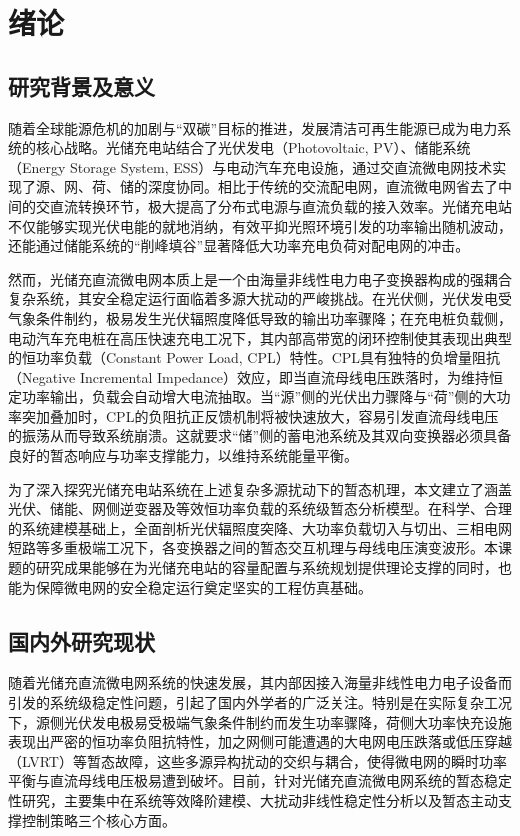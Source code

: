 \section{绪论}
\subsection{研究背景及意义}
随着全球能源危机的加剧与“双碳”目标的推进，发展清洁可再生能源已成为电力系统的核心战略。光储充电站结合了光伏发电（Photovoltaic, PV）、储能系统（Energy Storage System, ESS）与电动汽车充电设施，通过交直流微电网技术实现了源、网、荷、储的深度协同。相比于传统的交流配电网，直流微电网省去了中间的交直流转换环节，极大提高了分布式电源与直流负载的接入效率。光储充电站不仅能够实现光伏电能的就地消纳，有效平抑光照环境引发的功率输出随机波动，还能通过储能系统的“削峰填谷”显著降低大功率充电负荷对配电网的冲击。 


然而，光储充直流微电网本质上是一个由海量非线性电力电子变换器构成的强耦合复杂系统，其安全稳定运行面临着多源大扰动的严峻挑战。在光伏侧，光伏发电受气象条件制约，极易发生光伏辐照度降低导致的输出功率骤降；在充电桩负载侧，电动汽车充电桩在高压快速充电工况下，其内部高带宽的闭环控制使其表现出典型的恒功率负载（Constant Power Load, CPL）特性。CPL具有独特的负增量阻抗（Negative Incremental Impedance）效应，即当直流母线电压跌落时，为维持恒定功率输出，负载会自动增大电流抽取。当“源”侧的光伏出力骤降与“荷”侧的大功率突加叠加时，CPL的负阻抗正反馈机制将被快速放大，容易引发直流母线电压的振荡从而导致系统崩溃。这就要求“储”侧的蓄电池系统及其双向变换器必须具备良好的暂态响应与功率支撑能力，以维持系统能量平衡。


为了深入探究光储充电站系统在上述复杂多源扰动下的暂态机理，本文建立了涵盖光伏、储能、网侧逆变器及等效恒功率负载的系统级暂态分析模型。在科学、合理的系统建模基础上，全面剖析光伏辐照度突降、大功率负载切入与切出、三相电网短路等多重极端工况下，各变换器之间的暂态交互机理与母线电压演变波形。本课题的研究成果能够在为光储充电站的容量配置与系统规划提供理论支撑的同时，也能为保障微电网的安全稳定运行奠定坚实的工程仿真基础。
\subsection{国内外研究现状}

随着光储充直流微电网系统的快速发展，其内部因接入海量非线性电力电子设备而引发的系统级稳定性问题，引起了国内外学者的广泛关注。特别是在实际复杂工况下，源侧光伏发电极易受极端气象条件制约而发生功率骤降，荷侧大功率快充设施表现出严密的恒功率负阻抗特性，加之网侧可能遭遇的大电网电压跌落或低压穿越（LVRT）等暂态故障，这些多源异构扰动的交织与耦合，使得微电网的瞬时功率平衡与直流母线电压极易遭到破坏。目前，针对光储充直流微电网系统的暂态稳定性研究，主要集中在系统等效降阶建模、大扰动非线性稳定性分析以及暂态主动支撑控制策略三个核心方面。

